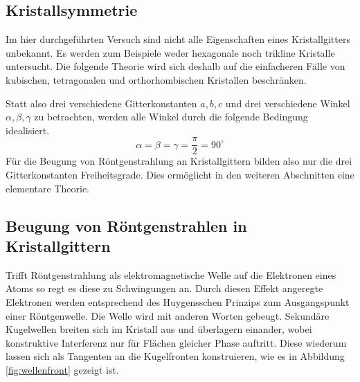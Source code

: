 

	\subsection{Kristallsymmetrie}
	\label{ssec:symmetrie}
	
		Im hier durchgeführten Versuch sind nicht alle Eigenschaften eines Kristallgitters unbekannt.
		Es werden zum Beispiele weder hexagonale noch trikline Kristalle untersucht.
		Die folgende Theorie wird sich deshalb auf die einfacheren Fälle von kubischen, tetragonalen und orthorhombischen Kristallen beschränken.

		Statt also drei verschiedene Gitterkonstanten $a,b,c$ und drei verschiedene Winkel $\alpha,\beta,\gamma$ zu betrachten, werden alle Winkel durch die folgende Bedingung idealisiert.
		\[
			\alpha = \beta = \gamma = \frac{\pi}{2} = 90^\circ
		\]
		Für die Beugung von Röntgenstrahlung an Kristallgittern bilden also nur die drei Gitterkonstanten Freiheitsgrade.
		Dies ermöglicht in den weiteren Abschnitten eine elementare Theorie.
	

	\subsection{Beugung von Röntgenstrahlen in Kristallgittern} %
	\label{sub:beugung_von_rntgenstrahlen_in_kristallgittern}
		
		Trifft Röntgenstrahlung als elektromagnetische Welle auf die Elektronen eines Atoms so regt es diese zu Schwingungen an.
		Durch diesen Effekt angeregte Elektronen werden entsprechend des Huygensschen Prinzips zum Ausgangspunkt einer Röntgenwelle.
		Die Welle wird mit anderen Worten gebeugt.
		Sekundäre Kugelwellen breiten sich im Kristall aus und überlagern einander, wobei konstruktive Interferenz nur für Flächen gleicher Phase auftritt.
		Diese wiederum lassen sich als Tangenten an die Kugelfronten konstruieren, wie es in Abbildung \ref{fig:wellenfront} gezeigt ist.

